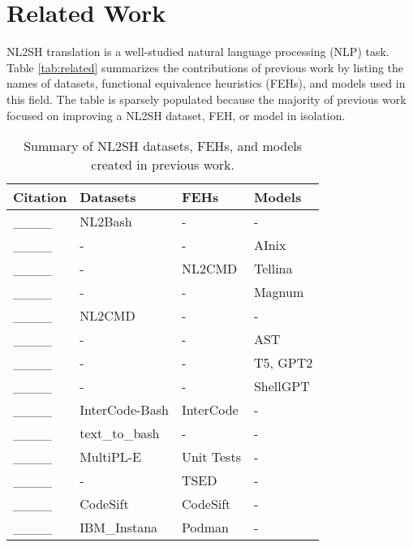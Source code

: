 \section{Related Work}
\label{sec:related-work}
NL2SH translation is a well-studied natural language processing (NLP) task. Table \ref{tab:related} summarizes the contributions of previous work by listing the names of datasets, functional equivalence heuristics (FEHs), and models used in this field. The table is sparsely populated because the majority of previous work focused on improving a NL2SH dataset, FEH, or model in isolation.

\begin{table}[ht!]
  \scriptsize
  \setlength{\tabcolsep}{2pt}
  \centering
  \caption{Summary of NL2SH datasets, FEHs, and models created in previous work.}
  \begin{tabular}{llll}
    \hline
    \textbf{Citation}       & \textbf{Datasets} & \textbf{FEHs} & \textbf{Models}  \\ \hline
    ____         & NL2Bash           & -             & -                \\
    ____           & -                 & -             & AInix            \\
    ____     & -                 & NL2CMD        & Tellina          \\
    ____          & -                 & -             & Magnum           \\
    ____        & NL2CMD            & -             & -                \\
    ____             & -                 & -             & AST              \\
    ____        & -                 & -             & T5, GPT2         \\
    ____        & -                 & -             & ShellGPT         \\
    ____       & InterCode-Bash    & InterCode     & -                \\
    ____        & text\_to\_bash    & -             & -                \\
    ____        & MultiPL-E         & Unit Tests    & -                \\
    ____            & -                 & TSED          & -                \\
    ____        & CodeSift          & CodeSift      & -                \\
    ____ & IBM\_Instana      & Podman        & -                \\

\end{tabular}
\end{table}
